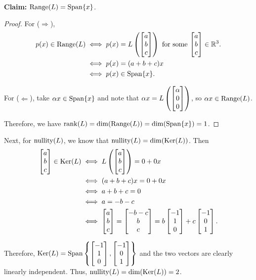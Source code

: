 \textbf{Claim:} $\operatorname{Range}(L) = \operatorname{Span}\{x\}$.
\begin{proof}
    For ($\Rightarrow$), \vspace{-8mm}
    \begin{align*}
        p(x) \in \operatorname{Range}(L) &\iff p(x) = L\left( \begin{bmatrix} a \\ b \\ c \end{bmatrix} \right) \text{ for some $\begin{bmatrix} a \\ b \\ c \end{bmatrix} \in {\mathbb{R}}^3$}. \\
        &\iff p(x) = (a+b+c)x \\
        &\iff p(x) \in \operatorname{Span}\{x\}.
    \end{align*}
    
    \vspace*{-5mm}For ($\Leftarrow$), take $\alpha x \in \operatorname{Span}\{x\}$ and note that $\alpha x = L \left( \begin{bmatrix} \alpha \\ 0 \\ 0 \end{bmatrix} \right)$, so $\alpha x \in \operatorname{Range}(L)$.

    Therefore, we have $\operatorname{rank}(L) = \dim(\operatorname{Range}(L)) = \dim(\operatorname{Span}\{x\}) = 1$.
\end{proof}

Next, for $\operatorname{nullity}(L)$, we know that $\operatorname{nullity}(L) = \dim(\operatorname{Ker}(L))$. Then \vspace{-4mm}
\begin{align*}
    \begin{bmatrix} a \\ b \\ c \end{bmatrix} \in \operatorname{Ker}(L) &\iff L \left( \begin{bmatrix} a \\ b \\ c \end{bmatrix} \right) = 0 + 0x \\
    &\iff (a+b+c)x = 0 + 0x \\
    &\iff a+b+c = 0 \\
    &\iff a = -b-c \\
    &\iff \begin{bmatrix} a \\ b \\ c \end{bmatrix} = \begin{bmatrix} -b-c \\ b \\ c \end{bmatrix} = b\begin{bmatrix} -1 \\ 1 \\ 0 \end{bmatrix} + c\begin{bmatrix} -1 \\ 0 \\ 1 \end{bmatrix}.
\end{align*}

Therefore, $\operatorname{Ker}(L) = \operatorname{Span} \left\{ \begin{bmatrix} -1 \\ 1 \\ 0 \end{bmatrix}, \begin{bmatrix} -1 \\ 0 \\ 1 \end{bmatrix} \right\}$ and the two vectors are clearly linearly independent. Thus, $\operatorname{nullity}(L) = \dim(\operatorname{Ker}(L)) = 2$.

